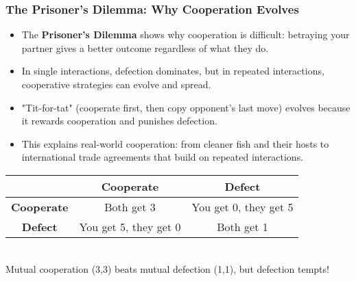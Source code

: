 \documentclass{beamer}
\begin{document}
	\begin{frame}
		\frametitle{The Prisoner's Dilemma: Why Cooperation Evolves}
		\begin{itemize}
			\item The \textbf{Prisoner's Dilemma} shows why cooperation is difficult: betraying your partner gives a better outcome regardless of what they do.
			\item In single interactions, defection dominates, but in repeated interactions, cooperative strategies can evolve and spread.
			\item "Tit-for-tat" (cooperate first, then copy opponent's last move) evolves because it rewards cooperation and punishes defection.
			\item This explains real-world cooperation: from cleaner fish and their hosts to international trade agreements that build on repeated interactions.
		\end{itemize}
		\begin{example}
			\begin{tabular}{|c|c|c|}
				\hline
				& \textbf{Cooperate} & \textbf{Defect} \\
				\hline
				\textbf{Cooperate} & Both get 3 & You get 0, they get 5 \\
				\hline
				\textbf{Defect} & You get 5, they get 0 & Both get 1 \\
				\hline
			\end{tabular}
			\\[0.3cm]
			Mutual cooperation (3,3) beats mutual defection (1,1), but defection tempts!
		\end{example}
	\end{frame}
	
\end{document}
